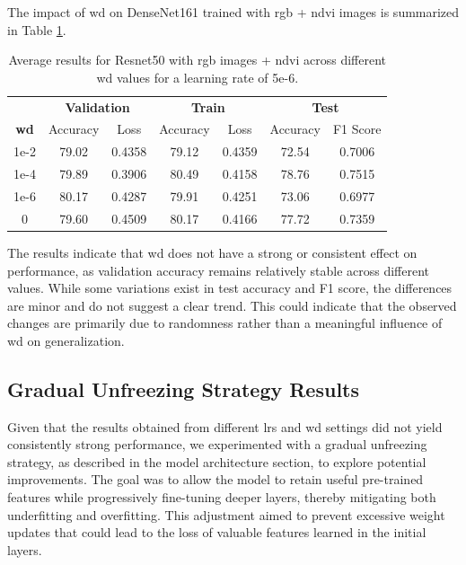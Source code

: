 The impact of \gls{wd} on DenseNet161 trained with \gls{rgb} + \gls{ndvi} images is summarized 
in Table \ref{tab:densenet161_wd_rgb_ndvi}.

\begin{table}[h]
    \centering
    \renewcommand{\arraystretch}{1.3}
    \setlength{\tabcolsep}{8pt}
    \begin{tabular}{|c|cccccc|}
        \hline
        & \multicolumn{2}{c}{\textbf{Validation}} & \multicolumn{2}{c}{\textbf{Train}} & \multicolumn{2}{c|}{\textbf{Test}} \\
        \textbf{\gls{wd}} & Accuracy & Loss & Accuracy & Loss & Accuracy & F1 Score \\
        \hline
        1e-2  & 79.02  & 0.4358 & 79.12  & 0.4359  & 72.54  & 0.7006 \\
        1e-4  & 79.89  & 0.3906 & 80.49  & 0.4158  & 78.76  & 0.7515 \\
        1e-6  & 80.17  & 0.4287 & 79.91  & 0.4251  & 73.06  & 0.6977 \\
        0     & 79.60  & 0.4509 & 80.17  & 0.4166  & 77.72  & 0.7359 \\
        \hline
    \end{tabular}
    \caption{Average results for Resnet50 with \gls{rgb} images + \gls{ndvi} across different \gls{wd} values for a learning rate of 5e-6.}
    \label{tab:densenet161_wd_rgb_ndvi}
\end{table}

The results indicate that \gls{wd} 
does not have a strong or consistent effect on performance, as validation accuracy 
remains relatively stable across different values. While some variations exist in test 
accuracy and F1 score, the differences are minor and do not suggest a clear trend. This 
could indicate that the observed changes are primarily due to randomness rather than a 
meaningful influence of \gls{wd} on generalization.

\subsection{Gradual Unfreezing Strategy Results}

Given that the results obtained from different \glspl{lr} and \gls{wd} settings 
did not yield consistently strong performance, we experimented with a gradual unfreezing strategy, 
as described in the model architecture section, to explore potential improvements. The goal was 
to allow the model to retain useful pre-trained features while progressively fine-tuning deeper 
layers, thereby mitigating both underfitting and overfitting. This adjustment aimed to prevent 
excessive weight updates that could lead to the loss of valuable features learned in the initial layers.

